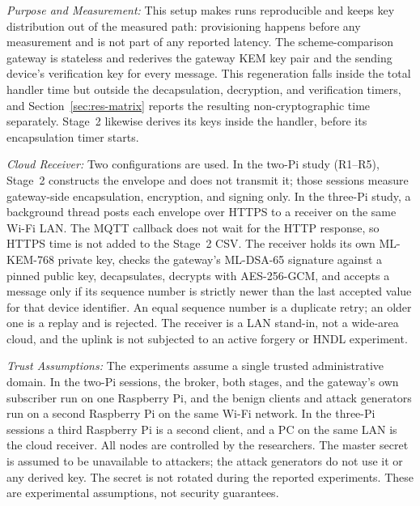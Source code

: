 \documentclass[journal]{IEEEtran}
\begin{document}
\textit{Purpose and Measurement:} This setup makes runs reproducible and keeps key distribution out of the measured path: provisioning happens before any measurement and is not part of any reported latency. The scheme-comparison gateway is stateless and rederives the gateway KEM key pair and the sending device's verification key for every message. This regeneration falls inside the total handler time but outside the decapsulation, decryption, and verification timers, and Section~\ref{sec:res-matrix} reports the resulting non-cryptographic time separately. Stage~2 likewise derives its keys inside the handler, before its encapsulation timer starts.

\textit{Cloud Receiver:} Two configurations are used. In the two-Pi study (R1--R5), Stage~2 constructs the envelope and does not transmit it; those sessions measure gateway-side encapsulation, encryption, and signing only. In the three-Pi study, a background thread posts each envelope over HTTPS to a receiver on the same Wi-Fi LAN. The MQTT callback does not wait for the HTTP response, so HTTPS time is not added to the Stage~2 CSV. The receiver holds its own ML-KEM-768 private key, checks the gateway's ML-DSA-65 signature against a pinned public key, decapsulates, decrypts with AES-256-GCM, and accepts a message only if its sequence number is strictly newer than the last accepted value for that device identifier. An equal sequence number is a duplicate retry; an older one is a replay and is rejected. The receiver is a LAN stand-in, not a wide-area cloud, and the uplink is not subjected to an active forgery or HNDL experiment.

\textit{Trust Assumptions:} The experiments assume a single trusted administrative domain. In the two-Pi sessions, the broker, both stages, and the gateway's own subscriber run on one Raspberry Pi, and the benign clients and attack generators run on a second Raspberry Pi on the same Wi-Fi network. In the three-Pi sessions a third Raspberry Pi is a second client, and a PC on the same LAN is the cloud receiver. All nodes are controlled by the researchers. The master secret is assumed to be unavailable to attackers; the attack generators do not use it or any derived key. The secret is not rotated during the reported experiments. These are experimental assumptions, not security guarantees.
\end{document}

